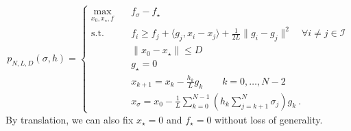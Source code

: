 \documentclass[11pt]{article}
\numberwithin{equation}{section}
\theoremstyle{definition}
\theoremstyle{definition}
\theoremstyle{definition}
\newcommand{\1}{\mathbf{1}}
\newcommand{\xStar}{x_\star}
\newcommand{\xSpecial}{x_\sigma}
\newcommand{\idxSpecial}{\sigma}
\begin{document}
\begin{equation}\label{Eqn:Interpolation}
    p_{N,L,D}(\sigma,h) = \begin{cases} \max_{x_0,\xStar,f} \quad & f_\idxSpecial - f_\star \\
                    \text{s.t.} \quad &f_i\geq f_j+\langle g_j,x_i-x_j\rangle +\frac{1}{2L}\| g_i - g_j\|^2 \quad \forall i\neq j \in \mathcal{I} \\
                    &\|x_0-\xStar\| \leq D \\
                    &g_\star = 0 \\
                    &x_{k+1} = x_k - \frac{h_k}{L} g_k \quad \quad k=0,\dots,N-2\\
                    & \xSpecial = x_0 - \frac{1}{L} \sum_{k=0}^{N-1} \left(h_k \sum_{j=k+1}^N \sigma_j\right) g_k \ .
                \end{cases}
\end{equation}
By translation, we can also fix $\xStar=0$ and $f_\star=0$ without loss of generality.
\end{document}
